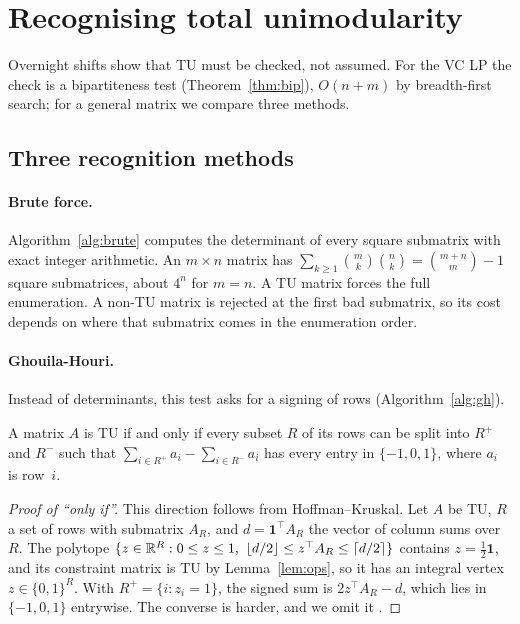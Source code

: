 \section{Recognising total unimodularity}\label{sec:recognise}

Overnight shifts show that TU must be checked, not assumed. For the VC LP the check is a bipartiteness test (Theorem~\ref{thm:bip}), $O(n+m)$ by breadth-first search; for a general matrix we compare three methods.

\subsection{Three recognition methods}\label{sec:methods}

\paragraph{Brute force.} Algorithm~\ref{alg:brute} computes the determinant of every square submatrix with exact integer arithmetic. An $m\times n$ matrix has $\sum_{k\ge1}\binom{m}{k}\binom{n}{k} = \binom{m+n}{m}-1$ square submatrices, about $4^n$ for $m=n$. A TU matrix forces the full enumeration. A non-TU matrix is rejected at the first bad submatrix, so its cost depends on where that submatrix comes in the enumeration order.

\paragraph{Ghouila-Houri.} Instead of determinants, this test asks for a signing of rows (Algorithm~\ref{alg:gh}).

\begin{theorem}\label{thm:gh}
  A matrix $A$ is TU if and only if every subset $R$ of its rows can be split into $R^+$ and $R^-$ such that $\sum_{i\in R^+} a_i - \sum_{i\in R^-} a_i$ has every entry in $\{-1,0,1\}$, where $a_i$ is row~$i$.
\end{theorem}
\begin{proof}[Proof of ``only if'']
  This direction follows from Hoffman--Kruskal. Let $A$ be TU, $R$ a set of rows with submatrix $A_R$, and $d = \mathbf 1^\top A_R$ the vector of column sums over~$R$. The polytope $\{z\in\R^R : 0\le z\le 1,\ \lfloor d/2\rfloor \le z^\top A_R \le \lceil d/2\rceil\}$ contains $z=\tfrac12\mathbf 1$, and its constraint matrix is TU by Lemma~\ref{lem:ops}, so it has an integral vertex $z\in\{0,1\}^R$. With $R^+=\{i : z_i=1\}$, the signed sum is $2z^\top A_R - d$, which lies in $\{-1,0,1\}$ entrywise. The converse is harder, and we omit it \cite{schrijver1986}.
\end{proof}

